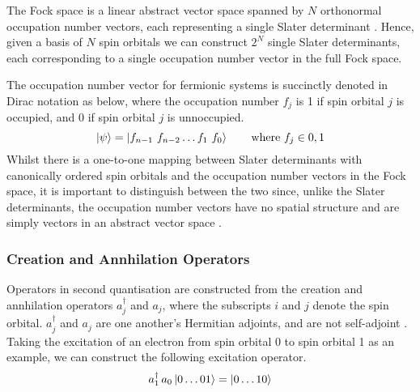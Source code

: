 The Fock space is a linear abstract vector space spanned by $N$ orthonormal occupation number vectors, each representing a single Slater determinant \cite{Helgaker2000}. Hence, given a basis of $N$ spin orbitals we can construct $2^N$ single Slater determinants, each corresponding to a single occupation number vector in the full Fock space.

The occupation number vector for fermionic systems is succinctly denoted in Dirac notation as below, where the occupation number $f_j$ is 1 if spin orbital $j$ is occupied, and 0 if spin orbital $j$ is unnoccupied.
\begin{equation*}
    \ket\psi = \ket{f_{n-1} \,\, f_{n-2} \dots f_{1} \,\, f_{0}} \qquad \text{where } f_{j} \in {0, 1}
\end{equation*}
Whilst there is a one-to-one mapping between Slater determinants with canonically ordered spin orbitals and the occupation number vectors in the Fock space, it is important to distinguish between the two since, unlike the Slater determinants, the occupation number vectors have no spatial structure and are simply vectors in an abstract vector space \cite{Helgaker2000}.


\subsubsection{Creation and Annhilation Operators}

Operators in second quantisation are constructed from the creation and annhilation operators $a_j^\dagger$ and $a_j$, where the subscripts $i$ and $j$ denote the spin orbital. $a_j^\dagger$ and $a_j$ are one another's Hermitian adjoints, and are not self-adjoint \cite{Helgaker2000}. Taking the excitation of an electron from spin orbital 0 to spin orbital 1 as an example, we can construct the following excitation operator.
\begin{equation*}
    a_1^\dagger \, a_0 \ket{0 \dots 01} = \ket{0 \dots 10}
\end{equation*}

